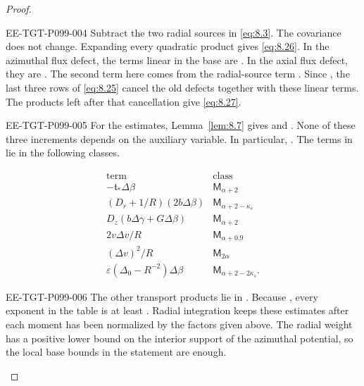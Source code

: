 \begin{proof}
\begin{EESegment}{EE-TGT-P099-004}
Subtract the two radial sources in \eqref{eq:8.3}. The covariance
 does not change. Expanding every quadratic product gives
\eqref{eq:8.26}. In the azimuthal flux defect, the terms linear in the base are
. In the axial flux defect, they are
. The second term here comes from the
radial-source term . Since
, the last three rows of \eqref{eq:8.25} cancel the
old defects together with these linear terms. The products left after that cancellation give
\eqref{eq:8.27}.
\end{EESegment}

\begin{EESegment}{EE-TGT-P099-005}
For the estimates, Lemma~\ref{lem:8.7} gives
 and
. None of these three increments depends
on the auxiliary variable. In particular,
. The terms in
 lie in the following classes.
\end{EESegment}
\[
\begin{array}{c|c}
\text{term}&\text{class}\\ \hline
-\mathfrak t_*\Delta\beta&\mathsf M_{\alpha+2}\\
(D_r+1/R)(2b\Delta\beta)&\mathsf M_{\alpha+2-\kappa_s}\\
D_z(b\Delta\gamma+G\Delta\beta)&\mathsf M_{\alpha+2}\\
2v\Delta v/R&\mathsf M_{\alpha+0.9}\\
(\Delta v)^2/R&\mathsf M_{2\alpha}\\
\varepsilon(\Delta_0-R^{-2})\Delta\beta&\mathsf M_{\alpha+2-2\kappa_s}.
\end{array}
\]
\begin{EESegment}{EE-TGT-P099-006}
The other transport products lie in
. Because
, every exponent in the table is at least
. Radial integration keeps these estimates after each
moment has been normalized by the factors given above. The radial weight has a positive lower bound
on the interior support of the azimuthal potential, so the local base bounds in the statement are
enough.
\end{EESegment}
\end{proof}

